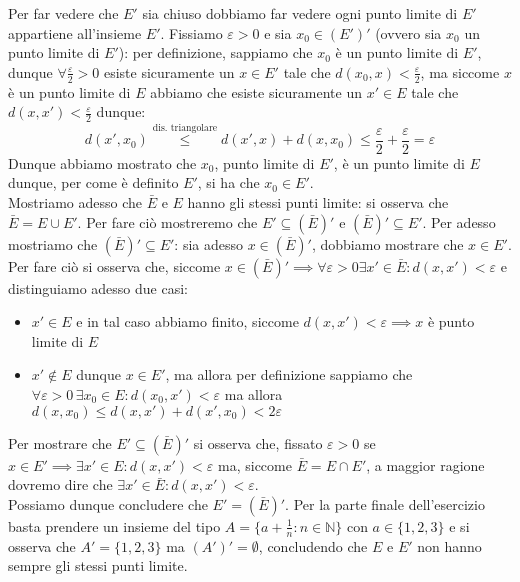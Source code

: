 \documentclass{report}
\begin{document}
\begin{mysolution}
	Per far vedere che $E'$ sia chiuso dobbiamo far vedere ogni punto limite di $E'$ appartiene all'insieme $E'$. Fissiamo $\varepsilon > 0$ e sia $x_0 \in (E')'$ (ovvero sia $x_0$ un punto limite di $E'$): per definizione, sappiamo che $x_0$ è un punto limite di $E'$, dunque $\forall \frac{\varepsilon}{2} > 0$ esiste sicuramente un $x \in E'$ tale che $d(x_0, x) < \frac{\varepsilon}{2}$, ma siccome $x$ è un punto limite di $E$ abbiamo che esiste sicuramente un $x' \in E$ tale che $d(x, x') < \frac{\varepsilon}{2}$ dunque:
	$$
		d(x', x_0) \stackrel{\text{dis. triangolare}}{\leq} d(x', x) + d(x, x_0) \leq \frac{\varepsilon}{2} + \frac{\varepsilon}{2} = \varepsilon
	$$
	Dunque abbiamo mostrato che $x_0$, punto limite di $E'$, è un punto limite di $E$ dunque, per come è definito $E'$, si ha che $x_0 \in E'$. \\
	Mostriamo adesso che $\bar{E}$ e $E$ hanno gli stessi punti limite: si osserva che $\bar{E} = E \cup E'$. Per fare ciò mostreremo che $E' \subseteq (\bar{E})'$ e $(\bar{E})' \subseteq E'$. Per adesso mostriamo che $(\bar{E})' \subseteq E'$: sia adesso $x \in (\bar{E})'$, dobbiamo mostrare che $x \in E'$. Per fare ciò si osserva che, siccome $x \in (\bar{E})' \implies \forall \varepsilon > 0 \exists x' \in \bar{E}: d(x, x') < \varepsilon$ e distinguiamo adesso due casi:
	\begin{itemize}
		\item $x' \in E$ e in tal caso abbiamo finito, siccome $d(x, x') < \varepsilon \implies x$ è punto limite di $E$
		\item $x' \not\in E$ dunque $x \in E'$, ma allora per definizione sappiamo che $\forall \varepsilon > 0 \, \exists x_0 \in E: d(x_0, x') < \varepsilon$ ma allora $d(x, x_0) \leq d(x, x') + d(x', x_0) < 2\varepsilon$ 	 
	\end{itemize}
	Per mostrare che $E' \subseteq (\bar{E})'$ si osserva che, fissato $\varepsilon > 0$ se $x \in E' \implies \exists x' \in E: d(x, x') < \varepsilon$ ma, siccome $\bar{E}=E \cap E'$, a maggior ragione dovremo dire che $\exists x' \in \bar{E}: d(x, x') < \varepsilon$. \\
	Possiamo dunque concludere che $E' = (\bar{E})'$. Per la parte finale dell'esercizio basta prendere un insieme del tipo $A = \{a+\frac{1}{n}: n \in \mathbb{N}\}$ con $a \in \{1, 2, 3 \}$ e si osserva che $A' = \{1, 2, 3\}$ ma $(A')' = \emptyset$, concludendo che $E$ e $E'$ non hanno sempre gli stessi punti limite.
	
\end{mysolution}
\end{document}
